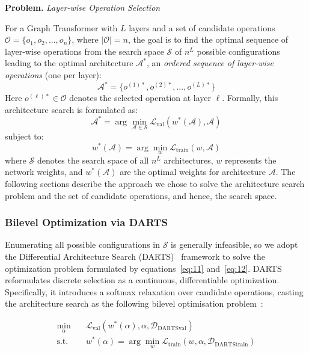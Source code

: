 \documentclass[lettersize,journal]{IEEEtran}
\newenvironment{problem}[1][]
  {\par\noindent\textbf{Problem.} \textit{#1} \par\noindent}{\par}
\begin{document}
\begin{problem}[Layer-wise Operation Selection]
For a Graph Transformer with $L$ layers and a set of candidate operations $\mathcal{O} = \{o_1, o_2, ..., o_n\}$, where $|\mathcal{O}| = n$, the goal is to find the optimal sequence of layer-wise operations from the search space $\mathcal{S}$ of $n^L$ possible configurations leading to the optimal architecture $\mathcal{A}^*$, an \textit{ordered sequence of layer-wise operations} (one per layer):
\begin{equation}
\mathcal{A}^* = \{o^{(1)*}, o^{(2)*}, ..., o^{(L)*}\}
\end{equation}
Here $o^{(\ell)*} \in \mathcal{O}$ denotes the selected operation at layer $\ell$. Formally, this architecture search is formulated as:
\begin{equation}
\label{eq:11}
\mathcal{A}^* = \arg\min_{\mathcal{A} \in \mathcal{S}} \mathcal{L}_{\text{val}}(w^*(\mathcal{A}), \mathcal{A})
\end{equation}
subject to:
\begin{equation}
\label{eq:12}
w^*(\mathcal{A}) = \arg\min_{w} \mathcal{L}_{\text{train}}(w, \mathcal{A})
\end{equation}
where $\mathcal{S}$ denotes the search space of all $n^L$ architectures, $w$ represents the network weights, and $w^*(\mathcal{A})$ are the optimal weights for architecture $\mathcal{A}$.  The following sections describe the approach we chose to solve the architecture search problem and the set of candidate operations, and hence, the search space.
\end{problem}

\subsubsection{Bilevel Optimization via DARTS}
Enumerating all possible configurations in $\mathcal{S}$ is generally infeasible, so we adopt the Differential Architecture Search (DARTS)~\cite{liu_darts_2019} framework to solve the optimization problem formulated by equations~\ref{eq:11} and~\ref{eq:12}. DARTS reformulates discrete selection as a continuous, differentiable optimization. Specifically, it introduces a softmax relaxation over candidate operations, 
casting the architecture search as the following bilevel optimisation problem~\cite{anandalingam_hierarchical_1992}:

\begin{equation}
\begin{aligned}
\min_{\alpha} \quad & \mathcal{L}_{\text{val}}(w^*(\alpha), \alpha,\mathcal{D}_{\text{DARTSval}}) \\
\text{s.t.} \quad & w^*(\alpha) = \arg\min_{w} \mathcal{L}_{\text{train}}(w, \alpha,\mathcal{D}_{\text{DARTStrain}})
\end{aligned}
\end{equation}
\end{document}
